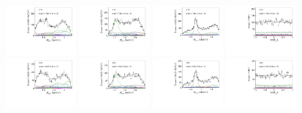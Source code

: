 \begin{figure}[htbp]
    \includegraphics[width=0.24\textwidth]{figure/pwa_nominal/s9_m_R_BC.pdf}
    \includegraphics[width=0.24\textwidth]{figure/pwa_nominal/s9_m_R_BD.pdf}
    \includegraphics[width=0.24\textwidth]{figure/pwa_nominal/s9_m_R_CD.pdf}
    \includegraphics[width=0.24\textwidth]{figure/pwa_nominal/s9_epemDSID_Lmdc_cos_beta.pdf} \\
    \includegraphics[width=0.24\textwidth]{figure/pwa_nominal/s10_m_R_BC.pdf}
    \includegraphics[width=0.24\textwidth]{figure/pwa_nominal/s10_m_R_BD.pdf}
    \includegraphics[width=0.24\textwidth]{figure/pwa_nominal/s10_m_R_CD.pdf}
    \includegraphics[width=0.24\textwidth]{figure/pwa_nominal/s10_epemDSID_Lmdc_cos_beta.pdf} \\

\end{figure}
